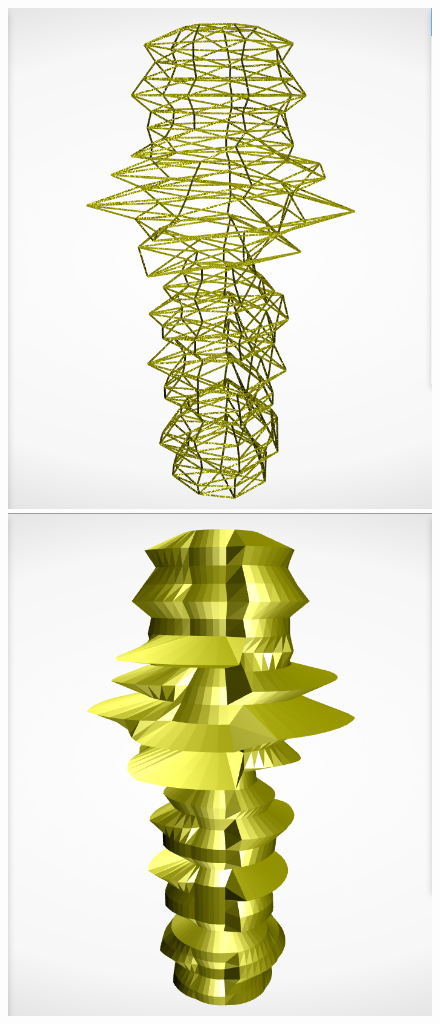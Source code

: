 \documentclass[../medieninformatik-arbeit.tex]{subfiles}
\begin{document}
\begin{figure}[t!]
\begin{minipage}{.225\textwidth}
  \includegraphics[width=\linewidth]{Configurator/img/sculpture-1w}
\end{minipage}
\begin{minipage}{.225\textwidth}
\centering
  \includegraphics[width=\linewidth]{Configurator/img/sculpture-2}

\end{minipage}
\end{figure}
\end{document}
